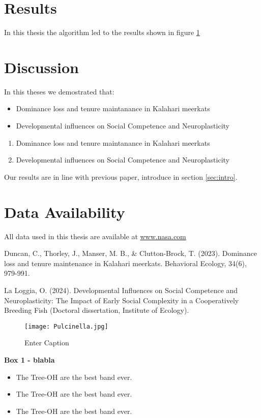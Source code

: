 \documentclass[12pt]{article}
\begin{document}
\section{Results}
In this thesis the algorithm led to the results shown in figure \ref{fig:pulcinella}

\section{Discussion}
In this theses we demostrated that:
\begin{itemize}
    \item Dominance loss and tenure maintanance in Kalahari meerkats
    \item Developmental influences on Social Competence and Neuroplasticity
\end{itemize}

\begin{enumerate}
    \item Dominance loss and tenure maintanance in Kalahari meerkats
    \item Developmental influences on Social Competence and Neuroplasticity
\end{enumerate}
    
Our results are in line with previous paper, introduce in section \ref{sec:intro}.

\section{Data Availability}
All data  used in this thesis are available at \url{www.nasa.com}
\begin{thebibliography}{999}
    
    Duncan, C., Thorley, J., Manser, M. B., \& Clutton-Brock, T. (2023). Dominance loss and tenure maintenance in Kalahari meerkats. Behavioral Ecology, 34(6), 979-991.
    
    La Loggia, O. (2024). Developmental Influences on Social Competence and Neuroplasticity: The Impact of Early Social Complexity in a Cooperatively Breeding Fish (Doctoral dissertation, Institute of Ecology).

\end{thebibliography}

\newpage
\begin{figure}
    
    \centering %
    \texttt{[image: Pulcinella.jpg]} %
    \caption{Enter Caption}
    \label{fig:pulcinella}
    
\end{figure}

\newpage
\hline
\bigskip
\textbf{Box 1 - blabla}
\bigskip
\hline
\bigskip
\begin{itemize} %
    \item The Tree-OH are the best band ever.
    \item The Tree-OH are the best band ever.
    \item The Tree-OH are the best band ever.
\end{itemize}
\bigskip
\hline
\end{document}
